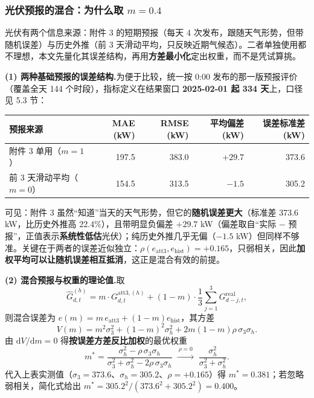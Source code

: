 \documentclass{cumcmthesis}
\begin{document}
\subsubsection{光伏预报的混合：为什么取 $m=0.4$}
光伏有两个信息来源：附件 3 的短期预报（每天 4 次发布，跟随天气形势，但带随机误差）与历史外推（前 3 天滑动平均，只反映近期气候态）。二者单独使用都不理想，本文先量化其误差结构，再用\textbf{方差最小化}定出权重，而不是凭试算挑。

\noindent\textbf{(1) 两种基础预报的误差结构.}为便于比较，统一按 0:00 发布的那一版预报评价（覆盖全天 144 个时段），指标定义在结果窗口 \textbf{2025-02-01 起 334 天}上，口径见 5.3 节：

\begin{center}
\small
\begin{tabular}{lrrrr}
\hline
预报来源 & MAE (kW) & RMSE (kW) & 平均偏差 (kW) & 误差标准差 (kW) \\
\hline
附件 3 单用（$m=1$） & 197.5 & 383.0 & $+29.7$ & 373.6 \\
前 3 天滑动平均（$m=0$） & 154.5 & 313.5 & $-1.5$ & 305.2 \\
\hline
\end{tabular}
\end{center}

可见：附件 3 虽然“知道”当天的天气形势，但它的\textbf{随机误差更大}（标准差 373.6 kW，比历史外推高 22.4\%），且带明显负偏差 $+29.7$ kW（偏差取自“实际 $-$ 预报”，正值表示\textbf{系统性低估}光伏）；纯历史外推几乎无偏（$-1.5$ kW）但同样不够准。关键在于两者的误差近似独立：$\rho(e_{\mathrm{att3}},e_{\mathrm{hist}})=+0.165$，只弱相关，因此\textbf{加权平均可以让随机误差相互抵消}，这正是混合有效的前提。

\noindent\textbf{(2) 混合预报与权重的理论值.}取
\begin{equation}
    \hat G^{(h)}_{d,t}=m\cdot G^{\mathrm{att3},(h)}_{d,t}+(1-m)\cdot \frac{1}{3}\sum_{j=1}^{3}G^{\mathrm{real}}_{d-j,t},
    \label{eq:q3_mix}
\end{equation}
则混合误差为 $e(m)=m\,e_{\mathrm{att3}}+(1-m)e_{\mathrm{hist}}$，其方差
\begin{equation}
    V(m)=m^2\sigma_3^2+(1-m)^2\sigma_h^2+2m(1-m)\rho\,\sigma_3\sigma_h .
\end{equation}
由 $\mathrm{d}V/\mathrm{d}m=0$ 得\textbf{按误差方差反比加权}的最优权重
\begin{equation}
    m^{*}=\frac{\sigma_h^2-\rho\,\sigma_3\sigma_h}{\sigma_3^2+\sigma_h^2-2\rho\,\sigma_3\sigma_h}
    \;\xrightarrow{\ \rho=0\ }\;
    \frac{\sigma_h^2}{\sigma_3^2+\sigma_h^2}.
\end{equation}
代入上表实测值（$\sigma_3=373.6$、$\sigma_h=305.2$、$\rho=+0.165$）得 $m^{*}=0.381$；若忽略弱相关，简化式给出 $m^{*}=305.2^2/(373.6^2+305.2^2)=\mathbf{0.400}$。
\end{document}
